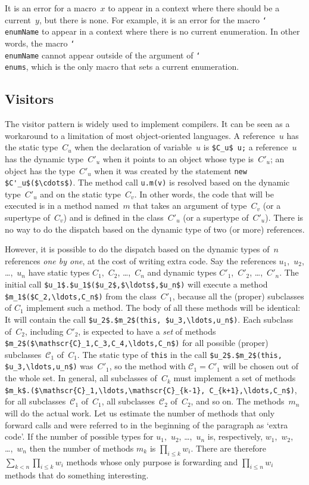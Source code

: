 \documentclass{llncs}
\newcommand{\jmlCode}{\lstinline[style=jml,basicstyle=\normalsize]}
\newcommand{\macro}[1]{\texttt{\char`\\#1}}
\begin{document}
It is an error for a macro~$x$ to appear in a context where
there should be a current~$y$, but there is none. For example,
it is an error for the macro \macro{enumName} to appear in a
context where there is no current enumeration. In other words,
the macro \macro{enumName} cannot appear outside of the argument
of \macro{enums}, which is the only macro that sets a current
enumeration.


\subsection{Visitors}
\label{sec:visitors}

The visitor pattern is widely used to implement compilers. It can
be seen as a workaround to a limitation of most object-oriented
languages. A reference~$u$ has the static type~$C_u$ when the
declaration of variable~$u$ is \jmlCode|$C_u$ u;| a reference~$u$
has the dynamic type~$C'_u$ when it points to an object whose
type is~$C'_u$; an object has the type~$C'_u$ when it was created
by the statement \jmlCode|new $C'_u$($\cdots$)|. The method call
\jmlCode|u.m(v)| is resolved based on the dynamic type~$C'_u$
and on the static type~$C_v$. In other words, the code that will
be executed is in a method named~$m$ that takes an argument
of type~$C_v$ (or a supertype of~$C_v$) and is defined in the
class~$C'_u$ (or a supertype of~$C'_u$). There is no way to
do the dispatch based on the dynamic type of two (or more)
references.

However, it is possible to do the dispatch based on the
dynamic types of~$n$ references \emph{one by one}, at the
cost of writing extra code. Say the references $u_1$,~$u_2$,
\dots,~$u_n$ have static types $C_1$,~$C_2$, \dots,~$C_n$ and
dynamic types $C'_1$,~$C'_2$, \dots,~$C'_n$. The initial call
\jmlCode|$u_1$.$u_1$($u_2$,$\ldots$,$u_n$)| will execute a method
\jmlCode|$m_1$($C_2,\ldots,C_n$)| from the class~$C'_1$, because
all the (proper) subclasses of $C_1$ implement such a method. The
body of all these methods will be identical: It will contain the
call \jmlCode|$u_2$.$m_2$(this, $u_3,\ldots,u_n$)|. Each subclass
of~$C_2$, including $C'_2$, is expected to have a \emph{set}
of methods \jmlCode|$m_2$($\mathscr{C}_1,C_3,C_4,\ldots,C_n$)|
for all possible (proper) subclasses~$\mathscr{C}_1$
of~$C_1$. The static type of \jmlCode|this| in the call
\jmlCode|$u_2$.$m_2$(this, $u_3,\ldots,u_n$)| was~$C'_1$, so the
method with $\mathscr{C}_1=C'_1$ will be chosen out of the whole
set. In general, all subclasses of~$C_k$ must implement a set of
methods \jmlCode|$m_k$.($\mathscr{C}_1,\ldots,\mathscr{C}_{k-1},
C_{k+1},\ldots,C_n$)|, for all subclasses~$\mathscr{C}_1$
of~$C_1$, all subclasses~$\mathscr{C}_2$ of~$C_2$, and so on. The
methods~$m_n$ will do the actual work. Let us estimate the number
of methods that only forward calls and were referred to in the
beginning of the paragraph as `extra code'. If the number of
possible types for $u_1$,~$u_2$, \dots,~$u_n$ is, respectively,
$w_1$,~$w_2$, \dots,~$w_n$ then the number of methods $m_k$ is
$\prod_{i\le k} w_i$. There are therefore $\sum_{k<n}\prod_{i\le
k} w_i$ methods whose only purpose is forwarding and $\prod_{i\le
n} w_i$ methods that do something interesting.
\end{document}
